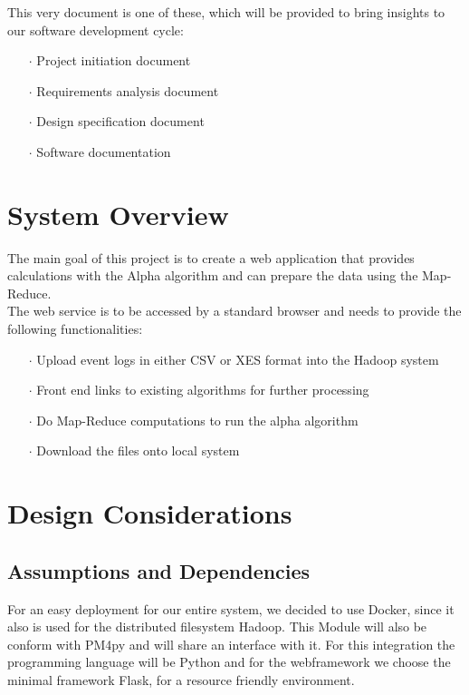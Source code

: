 \documentclass[runningheads]{llncs}
\begin{document}
\noindent
This very document is one of these, which will be provided to bring insights to our software development cycle:

\begin{itemize}
	\item[\Large $\cdot$]  Project initiation document
	\item[\Large $\cdot$]  Requirements analysis document
	\item[\Large $\cdot$]  Design specification document
	\item[\Large $\cdot$]  Software documentation
\end{itemize}

\section{System Overview}
The main goal of this project is to create a web application that provides calculations with the Alpha algorithm and can prepare the data using the Map-Reduce. \\

\noindent
The web service is to be accessed by a standard browser and needs to provide the following functionalities:
\begin{itemize}
	\item[\Large $\cdot$] Upload event logs in either CSV or XES format into the Hadoop system
	\item[\Large $\cdot$] Front end links to existing algorithms for further processing
	\item[\Large $\cdot$] Do Map-Reduce computations to run the alpha algorithm
	\item[\Large $\cdot$] Download the files onto local system
\end{itemize}

\section{Design Considerations}
\subsection{Assumptions and Dependencies}
For an easy deployment for our entire system, we decided to use Docker, since it also is used for the distributed filesystem Hadoop. This Module will also be conform with PM4py and will share an interface with it. For this integration the programming language will be Python and for the webframework we choose the minimal framework Flask, for a resource friendly environment. \\
\end{document}
